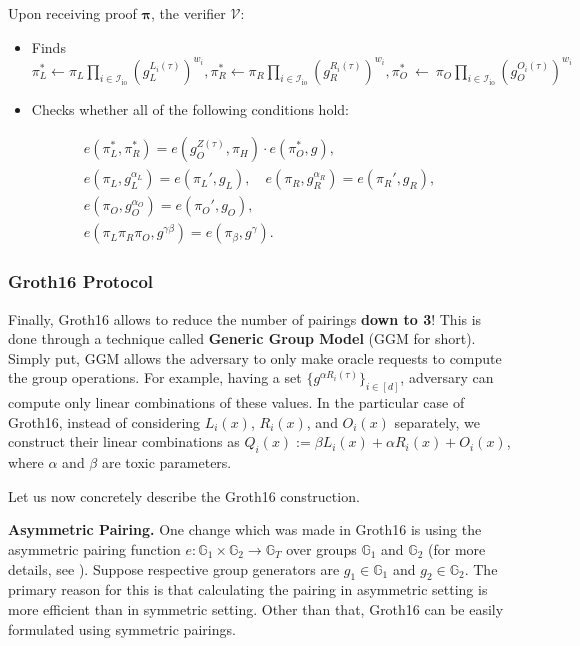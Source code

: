 \documentclass[../lecture-notes.tex]{subfiles}
\begin{document}
\begin{tcolorbox}
    Upon receiving proof $\boldsymbol{\pi}$, the verifier $\mathcal{V}$:
    \begin{itemize}[label=, left=0.6em]
        \item Finds $\pi_L^* \gets \pi_L\prod_{i \in \mathcal{I}_{\text{io}}} (g_L^{L_i(\tau)})^{w_i},\pi_R^* \gets \pi_R\prod_{i \in \mathcal{I}_{\text{io}}} (g_R^{R_i(\tau)})^{w_i},\pi_O^*~\gets~\pi_O\prod_{i \in \mathcal{I}_{\text{io}}} (g_O^{O_i(\tau)})^{w_i}$
        \item Checks whether all of the following conditions hold:
        
    \end{itemize}
    \begin{align*}
        e(\pi_L^*, \pi_R^*) = e(g_O^{Z(\tau)}, \pi_H)\cdot e(\pi_O^*, g),\\
        e(\pi_L, g_L^{\alpha_L}) = e(\pi_L', g_L), \quad e(\pi_R, g_R^{\alpha_R}) = e(\pi_R', g_R),\\
        e(\pi_O, g_O^{\alpha_O}) = e(\pi_O', g_O), \\
        e(\pi_L\pi_R\pi_O, g^{\gamma\beta}) = e(\pi_{\beta}, g^{\gamma}).
    \end{align*}
\end{tcolorbox}

\subsubsection{Groth16 Protocol}

Finally, Groth16 allows to reduce the number of pairings \textbf{down to 3}! This is done through a technique called \textbf{Generic Group Model} (GGM for short). Simply put, GGM allows the adversary to only make oracle requests to compute the group operations. For example, having a set $\{g^{\alpha R_i(\tau)}\}_{i \in [d]}$, adversary can compute only linear combinations of these values. In the particular case of Groth16, instead of considering $L_i(x)$, $R_i(x)$, and $O_i(x)$ separately, we construct their linear combinations as $Q_i(x) := \beta L_i(x) + \alpha R_i(x) + O_i(x)$, where $\alpha$ and $\beta$ are toxic parameters.

Let us now concretely describe the Groth16 construction.

\textcolor{gray!75!black}{\textbf{Asymmetric Pairing.}} One change which was made in Groth16 is using the asymmetric pairing function $e: \mathbb{G}_1 \times \mathbb{G}_2 \to \mathbb{G}_T$ over groups $\mathbb{G}_1$ and $\mathbb{G}_2$ (for more details, see ). Suppose respective group generators are $g_1 \in \mathbb{G}_1$ and $g_2 \in \mathbb{G}_2$. The primary reason for this is that calculating the pairing in asymmetric setting is more efficient than in symmetric setting. Other than that, Groth16 can be easily formulated using symmetric pairings.
\end{document}

